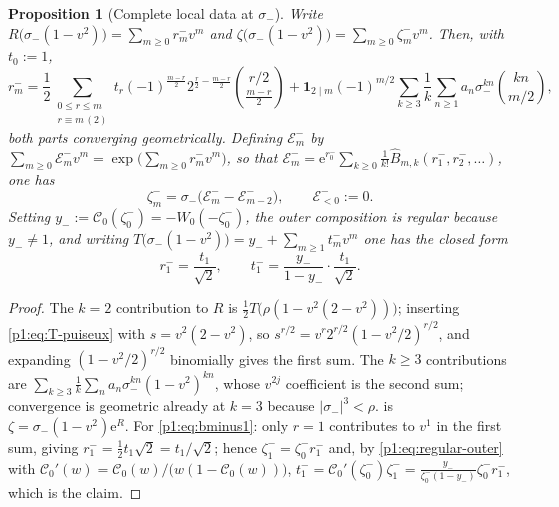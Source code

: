 \documentclass[11pt,a4paper,oneside]{book}
\theoremstyle{plain}
\newtheorem{proposition}[theorem]{Proposition}
\theoremstyle{definition}
\theoremstyle{remark}
\newcommand{\e}{\mathrm{e}}
\newcommand{\OB}{\widehat{B}}
\newcommand{\Wlam}{W}
\begin{document}
\begin{proposition}[Complete local data at $\sigma_-$]
\label{p1:prop:minus}
Write $R\bigl(\sigma_-(1-v^{2})\bigr)=\sum_{m\ge0}r^-_mv^{m}$ and
$\zeta\bigl(\sigma_-(1-v^{2})\bigr)=\sum_{m\ge0}\zeta^-_mv^{m}$.  Then, with $t_0:=1$,
\begin{equation}
 r^-_m=\frac12\!\!
 \sum_{\substack{0\le r\le m\\ r\equiv m\,(2)}}\!\!
 t_r(-1)^{\frac{m-r}{2}}2^{\frac r2-\frac{m-r}{2}}
 \binom{r/2}{\tfrac{m-r}{2}}
 +\mathbf 1_{2\mid m}(-1)^{m/2}
 \sum_{k\ge3}\frac1k\sum_{n\ge1}a_n\sigma_-^{kn}\binom{kn}{m/2},
 \label{p1:eq:rminus}
\end{equation}
both parts converging geometrically.  Defining $\mathcal E^-_m$ by $\sum_{m\ge0}\mathcal
E^-_mv^{m}=\exp\bigl(\sum_{m\ge0}r^-_mv^{m}\bigr)$, so that $\mathcal
E^-_m=\e^{r^-_0}\sum_{k\ge0}\frac1{k!}\OB_{m,k}(r^-_1,r^-_2,\ldots)$, one has
\begin{equation}
 \zeta^-_m=\sigma_-\bigl(\mathcal E^-_m-\mathcal E^-_{m-2}\bigr),
 \qquad \mathcal E^-_{<0}:=0 .
 \label{p1:eq:zminus}
\end{equation}
Setting $y_-:=\mathcal C_0(\zeta^-_0)=-\Wlam_0(-\zeta^-_0)$, the outer composition is regular
because $y_-\ne1$, and writing $T\bigl(\sigma_-(1-v^{2})\bigr)=y_-+\sum_{m\ge1}t^-_mv^{m}$ one
has the closed form
\begin{equation}
 \boxed{\;r^-_1=\frac{t_1}{\sqrt2},
 \qquad
 t^-_1=\frac{y_-}{1-y_-}\cdot\frac{t_1}{\sqrt2}.\;}
 \label{p1:eq:bminus1}
\end{equation}
\end{proposition}

\begin{proof}
The $k=2$ contribution to $R$ is $\tfrac12T\bigl(\rho(1-v^{2}(2-v^{2}))\bigr)$; inserting
\cref{p1:eq:T-puiseux} with $s=v^{2}(2-v^{2})$, so $s^{r/2}=v^{r}2^{r/2}(1-v^{2}/2)^{r/2}$,
and expanding $(1-v^{2}/2)^{r/2}$ binomially gives the first sum.  The $k\ge3$ contributions
are $\sum_{k\ge3}\frac1k\sum_na_n\sigma_-^{kn}(1-v^{2})^{kn}$, whose $v^{2j}$ coefficient is
the second sum; convergence is geometric already at $k=3$ because $|\sigma_-|^{3}<\rho$.
 is $\zeta=\sigma_-(1-v^{2})\e^{R}$. For \cref{p1:eq:bminus1}: only $r=1$
contributes to $v^{1}$ in the first sum, giving $r^-_1=\tfrac12t_1\sqrt2=t_1/\sqrt2$; hence
$\zeta^-_1=\zeta^-_0r^-_1$ and, by \cref{p1:eq:regular-outer} with $\mathcal C_0'(w)=\mathcal
C_0(w)/ \bigl(w(1-\mathcal C_0(w))\bigr)$, $t^-_1=\mathcal C_0'(\zeta^-_0)\zeta^-_1
=\frac{y_-}{\zeta^-_0(1-y_-)}\zeta^-_0r^-_1$, which is the claim.
\end{proof}
\end{document}

